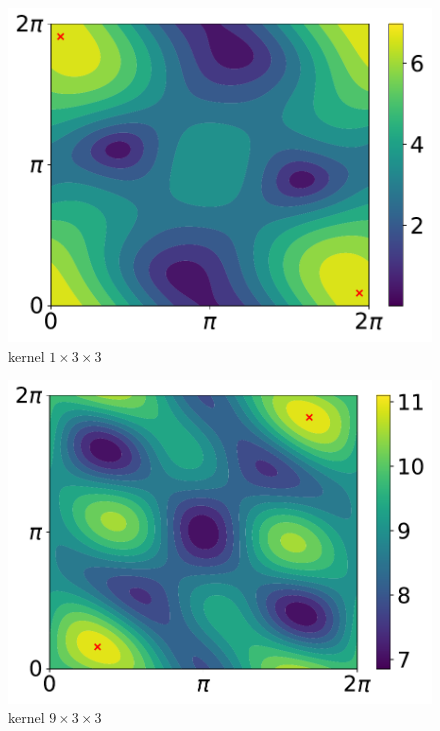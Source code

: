 \begin{figure}[htb]
  \centering
  \begin{minipage}{.24\linewidth}
    \centering
    \includegraphics[scale=0.23]{figures/chapter4/contour_poly_200_1_1_3.pdf}\\kernel $1\times3\times3$
  \end{minipage}
  \begin{minipage}{.24\linewidth}
      \centering
      \includegraphics[scale=0.23]{figures/chapter4/contour_poly_200_1_9_3.pdf}\\kernel $9\times3\times3$
  \end{minipage}
  \begin{minipage}{.24\linewidth}

\end{minipage}
\end{figure}
